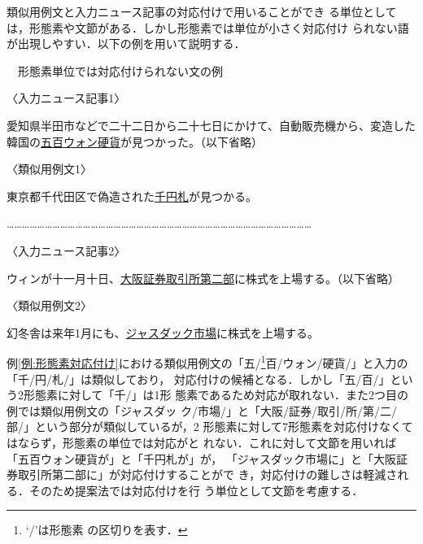 \documentclass[japanese]{jnlp_1.4}
\newcounter{exp}
\def\exp#1{}
\begin{document}
類似用例文と入力ニュース記事の対応付けで用いることができ
る単位としては，形態素や文節がある．しかし形態素では単位が小さく対応付け
られない語が出現しやすい．以下の例を用いて説明する．

\begin{screen}
\exp{例:形態素対応付け}　形態素単位では対応付けられない文の例

〈入力ニュース記事1〉

{\setlength{\leftskip}{2zw}
愛知県半田市などで二十二日から二十七日にかけて、自動販売機から、変造した
韓国の\ul{五百ウォン硬貨}が見つかった。（以下省略）
\par}

〈類似用例文1〉

{\setlength{\leftskip}{2zw}
東京都千代田区で偽造された\ul{千円札}が見つかる。
\par}

…………………………………………………………………………………………………………

〈入力ニュース記事2〉

{\setlength{\leftskip}{2zw}
ウィンが十一月十日、\ul{大阪証券取引所第二部}に株式を上場する。（以下省略）
\par}

〈類似用例文2〉

{\setlength{\leftskip}{2zw}
幻冬舎は来年1月にも、\ul{ジャスダック市場}に株式を上場する。
\par}
\end{screen}

\noindent
例\ref{例:形態素対応付け}における類似用例文の「五/\footnote{`/'は形態素
の区切りを表す．}百/ウォン/硬貨/」と入力の「千/円/札/」は類似しており，
対応付けの候補となる．しかし「五/百/」という2形態素に対して「千/」は1形
態素であるため対応が取れない．また2つ目の例では類似用例文の「ジャスダッ
ク/市場/」と「大阪/証券/取引/所/第/二/部/」という部分が類似しているが，2 
形態素に対して7形態素を対応付けなくてはならず，形態素の単位では対応がと
れない．これに対して文節を用いれば「五百ウォン硬貨が」と「千円札が」が，
「ジャスダック市場に」と「大阪証券取引所第二部に」が対応付けすることがで
き，対応付けの難しさは軽減される．そのため提案法では対応付けを行
う単位として文節を考慮する．
\end{document}
